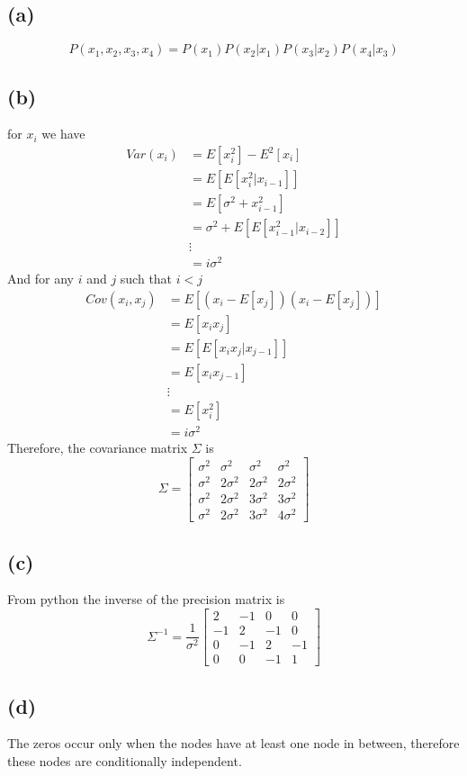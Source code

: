 \documentclass[12pt]{article}
\begin{document}
 \subsection*{(a)}

$$P(x_1,x_2,x_3,x_4)=\boxed{P(x_1)P(x_2|x_1)P(x_3|x_2)P(x_4|x_3)}$$
\subsection*{(b)}
for $x_i$ we have
\begin{align*}
    Var(x_i)&=E[x_i^2]-E^2[x_i]\\
    &=E[E[x_i^2|x_{i-1}]]\\
    &=E[\sigma^2+x_{i-1}^2]\\
    &=\sigma^2+E[E[x_{i-1}^2|x_{i-2}]]\\
    &\vdots\\
    &=i\sigma^2
\end{align*}
And for any $i$ and $j$ such that $i<j$
\begin{align*}
    Cov(x_i,x_j)&=E[(x_i-E[x_j])(x_i-E[x_j])]\\
    &=E[x_ix_j]\\
    &=E[E[x_ix_j|x_{j-1}]]\\
    &=E[x_ix_{j-1}]\\
    &\vdots\\
    &=E[x_i^2]\\
    &=i\sigma^2
\end{align*}
Therefore, the covariance matrix $\Sigma$ is
$$\Sigma=\boxed{\begin{bmatrix}
    \sigma^2 & \sigma^2 & \sigma^2 & \sigma^2\\
    \sigma^2 & 2\sigma^2 & 2\sigma^2 & 2\sigma^2\\
    \sigma^2 & 2\sigma^2 & 3\sigma^2 & 3\sigma^2\\
    \sigma^2 & 2\sigma^2 & 3\sigma^2 & 4\sigma^2
    \end{bmatrix}}$$

\subsection*{(c)}
From python the inverse of the precision matrix is 
$$\Sigma^{-1}=\frac{1}{\sigma^2}\boxed{\begin{bmatrix}
    2 & -1 &  0 &  0\\
    -1&  2& -1&  0\\
    0 & -1&  2& -1\\
    0 & 0 & -1 & 1
    \end{bmatrix}}$$
\subsection*{(d)}
The zeros occur only when the nodes have at least one node in between, therefore these nodes are conditionally independent.
\end{document}
